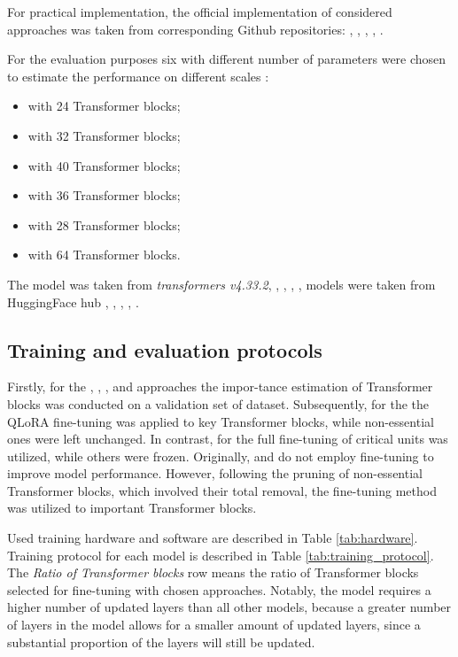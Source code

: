 For practical implementation, the official implementation of considered approaches was taken from corresponding Github repositories: \uidl{} \cite{uidl_github}, \sleb{} \cite{sleb_github}, \shortllama{} \cite{short_llama_github}, \ows{} \cite{ows}, \lisa{} \cite{lisa}.

For the evaluation purposes six \llms{} with different number of parameters were chosen to estimate the performance on different scales \llms{}: 
\begin{itemize}
    \item \gpt{} with 24 Transformer blocks;
    \item \llamaTwoSmall{} with 32 Transformer blocks;
    \item \llamaTwoBig{} with 40 Transformer blocks;
    \item \qwenSmall{} with 36 Transformer blocks;
    \item \qwenMedium{} with 28 Transformer blocks;
    \item \qwenLarge{} with 64 Transformer blocks.
\end{itemize}
The \gpt{} model was taken from \textit{transformers v4.33.2},  \llamaTwoSmall{}, \llamaTwoBig{}, \qwenSmall{}, \qwenMedium{}, \qwenLarge{} models were taken from HuggingFace hub \cite{huggingface:llama2-7b}, \cite{huggingface:llama2-13b}, \cite{huggingface:qwen-small}, \cite{huggingface:qwen-medium}, \cite{huggingface:qwen-large}.

\subsection{Training and evaluation protocols}
Firstly, for the \uidl{}, \sleb{}, \shortllama{}, and \ows{} approaches the impor-tance estimation of Transformer blocks was conducted on a validation set of \alpaca{} dataset. Subsequently, for the \uidl{} the QLoRA fine-tuning was applied to key Transformer blocks, while non-essential ones were left unchanged.
In contrast, for \ows{} the full fine-tuning of critical units was utilized, while others were frozen. Originally, \sleb{} and \shortllama{} do not employ fine-tuning to improve model performance. However, following the pruning of non-essential Transformer blocks, which involved their total removal, the \lora{} fine-tuning method was utilized to important Transformer blocks.



Used training hardware and software are described in Table \ref{tab:hardware}. Training protocol for each model is described in Table \ref{tab:training_protocol}. The \textit{Ratio of Transformer blocks} row means the ratio of Transformer blocks selected for fine-tuning with chosen approaches. Notably, the \gpt{} model requires a higher number of updated layers than all other models, because a greater number of layers in the model allows for a smaller amount of updated layers, since a substantial proportion of the layers will still be updated.

